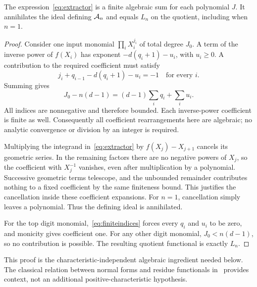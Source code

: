 \begin{proposition}\label{prop:extractor}
The expression~\eqref{eq:extractor} is a finite algebraic sum for
each polynomial $J$. It annihilates the ideal defining $\mathcal A_n$
and equals $L_n$ on the quotient, including when $n=1$.
\end{proposition}
\begin{proof}
Consider one input monomial $\prod_iX_i^{j_i}$ of total degree
$J_0$. A term of the inverse power of $f(X_i)$ has exponent
$-d(q_i+1)-u_i$, with $u_i\ge0$. A contribution to the required
coefficient must satisfy
\[
 j_i+q_{i-1}-d(q_i+1)-u_i=-1
 \quad\text{for every }i.
\]
Summing gives
\begin{equation}\label{eq:finiteindices}
 J_0-n(d-1)=(d-1)\sum_iq_i+\sum_i u_i.
\end{equation}
All indices are nonnegative and therefore bounded. Each
inverse-power coefficient is finite as well. Consequently all
coefficient rearrangements here are algebraic; no analytic
convergence or division by an integer is required.

Multiplying the integrand in~\eqref{eq:extractor} by
$f(X_j)-X_{j+1}$ cancels its geometric series. In the remaining
factors there are no negative powers of $X_j$, so the coefficient
with $X_j^{-1}$ vanishes, even after multiplication by a
polynomial. Successive geometric terms telescope, and the
unbounded remainder contributes nothing to a fixed coefficient by
the same finiteness bound. This justifies the cancellation inside
these coefficient expansions. For $n=1$, cancellation simply
leaves a polynomial. Thus the defining ideal is annihilated.

For the top digit monomial,~\eqref{eq:finiteindices} forces every
$q_i$ and $u_i$ to be zero, and monicity gives coefficient one.
For any other digit monomial, $J_0<n(d-1)$, so no contribution is
possible. The resulting quotient functional is exactly $L_n$.
\end{proof}

This proof is the characteristic-independent algebraic ingredient
needed below. The classical relation between normal forms and
residue functionals in~\cite[Section~4 of the preprint version]{CDS1996} provides context,
not an additional positive-characteristic hypothesis.
